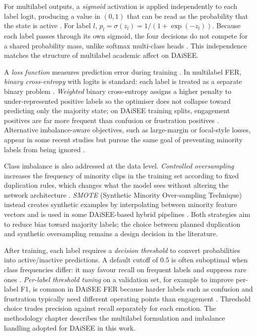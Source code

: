For multilabel outputs, a \emph{sigmoid} activation is applied independently to each label logit, producing a value in $(0,1)$ that can be read as the probability that the state is active \cite{mehta_three-dimensional_2022,rianto_engagement_2025}. For label $l$, $p_l = \sigma(z_l) = 1/(1+\exp(-z_l))$. Because each label passes through its own sigmoid, the four decisions do not compete for a shared probability mass, unlike softmax multi-class heads \cite{rianto_engagement_2025,gupta_daisee_2016}. This independence matches the structure of multilabel academic affect on DAiSEE.

A \emph{loss function} measures prediction error during training \cite{abedi_improving_2021}. In multilabel FER, \emph{binary cross-entropy} with logits is standard: each label is treated as a separate binary problem \cite{mehta_three-dimensional_2022,rianto_engagement_2025}. \emph{Weighted} binary cross-entropy assigns a higher penalty to under-represented positive labels so the optimiser does not collapse toward predicting only the majority state; on DAiSEE training splits, engagement positives are far more frequent than confusion or frustration positives \cite{gupta_daisee_2016,mehta_three-dimensional_2022,santoni_convolutional_2023}. Alternative imbalance-aware objectives, such as large-margin or focal-style losses, appear in some recent studies but pursue the same goal of preventing minority labels from being ignored \cite{rianto_engagement_2025}.

Class imbalance is also addressed at the data level. \emph{Controlled oversampling} increases the frequency of minority clips in the training set according to fixed duplication rules, which changes what the model sees without altering the network architecture \cite{santoni_convolutional_2023,abedi_improving_2021}. \emph{SMOTE} (Synthetic Minority Over-sampling Technique) instead creates synthetic examples by interpolating between minority feature vectors and is used in some DAiSEE-based hybrid pipelines \cite{santoni_convolutional_2023,rao_recognition_2021}. Both strategies aim to reduce bias toward majority labels; the choice between planned duplication and synthetic oversampling remains a design decision in the literature.

After training, each label requires a \emph{decision threshold} to convert probabilities into active/inactive predictions. A default cutoff of $0.5$ is often suboptimal when class frequencies differ: it may favour recall on frequent labels and suppress rare ones \cite{rianto_engagement_2025,mehta_three-dimensional_2022}. \emph{Per-label threshold tuning} on a validation set, for example to improve per-label F1, is common in DAiSEE FER because harder labels such as confusion and frustration typically need different operating points than engagement \cite{rianto_engagement_2025,mehta_three-dimensional_2022,lek_academic_2023}. Threshold choice trades precision against recall separately for each emotion. The methodology chapter describes the multilabel formulation and imbalance handling adopted for DAiSEE in this work.

